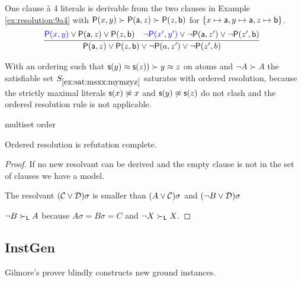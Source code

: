 \begin{example}\label{ex:resolution:1a4}
	One clause à 4 literals is derivable from the two clauses
	in Example \vref{ex:resolution:9a4} with $\mathsf{P}(x,y)\succ\mathsf{P}(\mathsf{a},z)\succ\mathsf{P}(z,\mathsf{b})$
	for $\{x\mapsto\mathsf{a}, y\mapsto\mathsf{a},z\mapsto\mathsf{b}\}$.
	\begin{gather*}
	\infer[]{\mP(\ma,z)\lor\mP(z,\mb)\lor\lnot\mP(a,z')\lor\lnot\mP(z',b)}
	{{\colN\mP(x,y)}\lor\mP(\ma,z)\lor\mP(z,\mb) & {\colN\lnot\mP(x',y')}\lor\lnot\mP(\ma,z')\lor\lnot\mP(z',\mb)}
	\end{gather*}

\end{example}

\begin{example}
	With an ordering such that $\mathsf{s}(y)\approx\mathsf{s}(z)) \succ y\approx z$ on atoms and ${\lnot A} \succ A$
	the satisfiable set $S_{\ref{ex:sat:msxx:mymzyz}}$ saturates with ordered resolution,
	because the strictly maximal literals
	$\mathsf{s}(x)\not\approx x$ and
	$\mathsf{s}(y)\not\approx\mathsf{s}(z)$
	do not clash and the ordered resolution rule is not applicable.
\end{example}


\begin{definition}
	multiset order
\end{definition}

\begin{lemma}
	Ordered resolution is refutation complete.
\end{lemma}

\begin{proof}
	If no new resolvant can be derived and the empty clause is not in the set of clauses we have a model.

	The resolvant $(\mathcal{C}\lor\mathcal{D})\sigma$ is smaller than $(A\lor\mathcal{C})\sigma$ and $(\lnot B\lor\mathcal{D})\sigma$

	$\lnot B \succ_{\mathsf{L}} A$ because $A\sigma=B\sigma=C$ and $\lnot X\succ_{\mathsf{L}} X$.
\end{proof}








\subsection{InstGen}\label{sec:inst:gen}

Gilmore's prover blindly constructs new ground instances.


